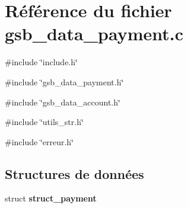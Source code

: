 \section{Référence du fichier gsb\_\-data\_\-payment.c}
\label{gsb__data__payment_8c}
{\ttfamily \#include \char`\"{}include.h\char`\"{}}\par
{\ttfamily \#include \char`\"{}gsb\_\-data\_\-payment.h\char`\"{}}\par
{\ttfamily \#include \char`\"{}gsb\_\-data\_\-account.h\char`\"{}}\par
{\ttfamily \#include \char`\"{}utils\_\-str.h\char`\"{}}\par
{\ttfamily \#include \char`\"{}erreur.h\char`\"{}}\par
\subsection*{Structures de données}
\begin{DoxyCompactItemize}
\item 
struct {\bf struct\_\-payment}
\end{DoxyCompactItemize}
